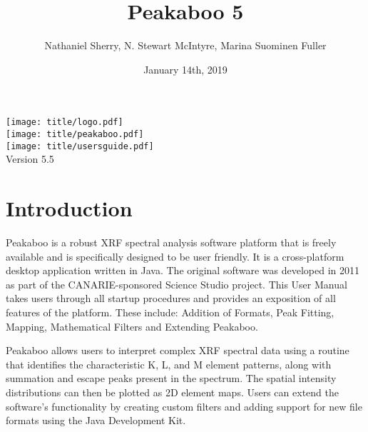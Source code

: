 \documentclass[article,twoside,11pt]{report}
\title{Peakaboo 5}
\date{January 14th, 2019}
\author{Nathaniel Sherry, N. Stewart McIntyre, Marina Suominen Fuller}
\newcommand{\tocchapter}[1]{\cleardoublepage\chapter*{#1}\addcontentsline{toc}{chapter}{#1}}
\begin{document}
\renewcommand{\headrulewidth}{0pt}
\lhead[]{}
\rhead[]{}


\pagestyle{empty}



\begin{titlepage}
	\vspace*{\fill}
	\centering
	\texttt{[image: title/logo.pdf]}\\
	\vspace*{1em}
	\texttt{[image: title/peakaboo.pdf]}\\
	\vspace*{1em}
	\texttt{[image: title/usersguide.pdf]}\\
	\vspace*{\fill}
	\vspace*{\fill}
	Version 5.5
\end{titlepage}

\cleardoublepage

\pagestyle{empty}
\setcounter{tocdepth}{1}
\tableofcontents
{}
\cleardoublepage
\setcounter{page}{1}
\pagestyle{fancyplain}



\tocchapter{Introduction}

Peakaboo is a robust XRF spectral analysis software platform that is freely available and is specifically designed to be user friendly. It is a cross-platform desktop application written in Java. The original software was developed in 2011 as part of the CANARIE-sponsored Science Studio project. This User Manual takes users through all startup procedures and provides an exposition of all features of the platform. These include: Addition of Formats, Peak Fitting, Mapping, Mathematical Filters and Extending Peakaboo.

Peakaboo allows users to interpret complex XRF spectral data using a routine that identifies the characteristic K, L, and M element patterns, along with summation and escape peaks present in the spectrum. The spatial intensity distributions can then be plotted as 2D element maps. Users can extend the software's functionality by creating custom filters and adding support for new file formats using the Java Development Kit.
\end{document}
